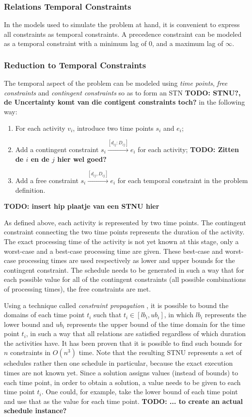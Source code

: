 \documentclass{article}
\newcommand{\TODO}[1]{{\color{red}\textbf{TODO: #1}}}
\begin{document}
\subsubsection{Relations Temporal Constraints}
In the models used to simulate the problem at hand, it is convenient to express all constraints as temporal constraints.
A precedence constraint can be modeled as a temporal constraint with a minimum lag of $0$, and a maximum lag of $\infty$.

\subsubsection{Reduction to Temporal Constraints}
The temporal aspect of the problem can be modeled using \emph{time points}, \emph{free constraints} and \emph{contingent constraints} so as to form an STN \TODO{STNU?, de Uncertainty komt van die contigent constraints toch?} in the following way:
\begin{enumerate}
\item For each activity $v_i$, introduce two time points $s_i$ and $e_i$;
\item Add a contingent constraint $s_i \xrightarrow{[d_{ij}:D_{ij}]} e_i$ for each activity; \TODO{Zitten de $i$ en de $j$ hier wel goed?}
\item Add a free constraint $s_i \xrightarrow{[d_{ij},D_{ij}]} e_i$ for each temporal constraint in the problem definition.
\end{enumerate}

\TODO{insert hip plaatje van een STNU hier}

As defined above, each activity is represented by two time points.
The contingent constraint connecting the two time points represents the duration of the activity.
The exact processing time of the activity is not yet known at this stage, only a worst-case and a best-case processing time are given.
These best-case and worst-case processing times are used respectively as lower and upper bounds for the contingent constraint.
The schedule needs to be generated in such a way that for each possible value for all of the contingent constraints (all possible combinations of processing times), the free constraints are met.

Using a technique called \emph{constraint propagation} \cite{policella07}, it is possible to bound the domains of each time point $t_i$ such that $t_i \in [lb_i, ub_i]$, in which $lb_i$ represents the lower bound and $ub_i$ represents the upper bound of the time domain for the time point $t_i$, in such a way that all relations are satisfied regardless of which duration the activities have.
It has been proven that it is possible to find such bounds for $n$ constraints in $O(n^3)$ time.
Note that the resulting STNU represents a set of schedules rather then one schedule in particular, because the exact execution times are not known yet.
Since a solution assigns values (instead of bounds) to each time point, in order to obtain a solution, a value needs to be given to each time point $t_i$.
One could, for example, take the lower bound of each time point and use that as the value for each time point.
\TODO{... to create an actual schedule instance?}
\end{document}
